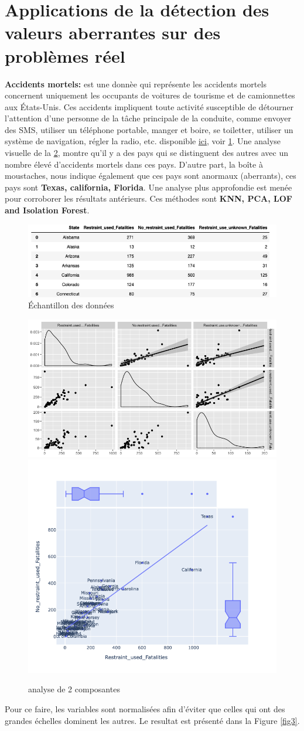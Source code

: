 \section{Applications de la détection des valeurs aberrantes sur des problèmes réel}
\textbf{Accidents mortels:}
 est une donnèe qui représente les accidents mortels concernent uniquement les occupants de voitures de tourisme et de camionnettes aux États-Unis. Ces accidents impliquent toute activité susceptible de détourner l'attention d'une personne de la tâche principale de la conduite, comme envoyer des SMS, utiliser un téléphone portable, manger et boire, se toiletter, utiliser un système de navigation, régler la radio, etc. disponible  \href{https://www.bts.dot.gov/content/passenger-car-and-light-truck-occupants-killed-and-restraint-use}{\underline{ici}}, voir \ref{fig1}. Une analyse visuelle de la \ref{fig2}, montre qu'il y a des pays qui se distinguent des autres avec un nombre élevé d'accidents mortels dans ces pays. D'autre part, la boîte à moustaches, nous indique également que ces pays sont anormaux (aberrants), ces pays sont \textbf{Texas, california, Florida}. Une analyse plus approfondie est menée pour corroborer les résultats antérieurs. Ces méthodes sont \textbf{ KNN, PCA, LOF and Isolation Forest}.  
 \begin{figure}[h]
    \centering
    \includegraphics[width=.7\textwidth]{ADOA/Images/fatalhead.png}
    \caption{Échantillon des données}%
    \label{fig1}
\end{figure}
 \begin{figure}[h]
    \centering
    \includegraphics[width=.55\textwidth]{ADOA/Images/Fatal.png}
    \includegraphics[width=.40\textwidth]{ADOA/Images/Fatal1.png}
    \caption{analyse de 2 composantes}%
    \label{fig2}
\end{figure}
 Pour ce faire, les variables sont normalisées afin d’éviter que celles qui ont des grandes échelles dominent les autres. Le resultat est présenté dans la Figure \ref{fig3}. 

